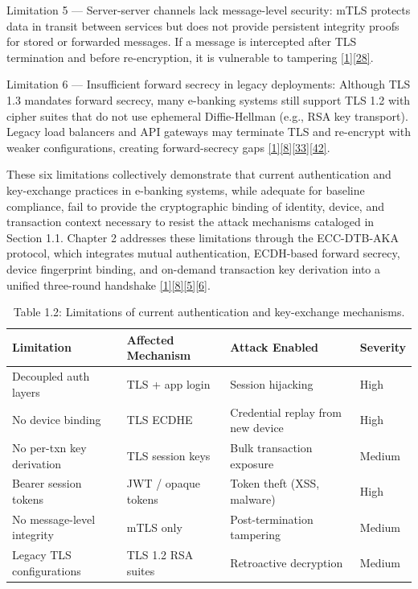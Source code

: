 \indent Limitation 5 --- Server-server channels lack message-level security: mTLS protects data in transit between services but does not provide persistent integrity proofs for stored or forwarded messages. If a message is intercepted after TLS termination and before re-encryption, it is vulnerable to tampering \hyperref[ref:1]{[1]}\hyperref[ref:28]{[28]}.

\indent Limitation 6 --- Insufficient forward secrecy in legacy deployments: Although TLS 1.3 mandates forward secrecy, many e-banking systems still support TLS 1.2 with cipher suites that do not use ephemeral Diffie-Hellman (e.g., RSA key transport). Legacy load balancers and API gateways may terminate TLS and re-encrypt with weaker configurations, creating forward-secrecy gaps \hyperref[ref:1]{[1]}\hyperref[ref:8]{[8]}\hyperref[ref:33]{[33]}\hyperref[ref:42]{[42]}.

\indent These six limitations collectively demonstrate that current authentication and key-exchange practices in e-banking systems, while adequate for baseline compliance, fail to provide the cryptographic binding of identity, device, and transaction context necessary to resist the attack mechanisms cataloged in Section 1.1. Chapter 2 addresses these limitations through the ECC-DTB-AKA protocol, which integrates mutual authentication, ECDH-based forward secrecy, device fingerprint binding, and on-demand transaction key derivation into a unified three-round handshake \hyperref[ref:1]{[1]}\hyperref[ref:8]{[8]}\hyperref[ref:5]{[5]}\hyperref[ref:6]{[6]}.

\begin{table}[htbp]
\centering
\begin{tabular}{llll}
\toprule
Limitation & Affected Mechanism & Attack Enabled & Severity \\
\midrule
Decoupled auth layers & TLS + app login & Session hijacking & High \\
No device binding & TLS ECDHE & Credential replay from new device & High \\
No per-txn key derivation & TLS session keys & Bulk transaction exposure & Medium \\
Bearer session tokens & JWT / opaque tokens & Token theft (XSS, malware) & High \\
No message-level integrity & mTLS only & Post-termination tampering & Medium \\
Legacy TLS configurations & TLS 1.2 RSA suites & Retroactive decryption & Medium \\
\bottomrule
\end{tabular}
\caption{Table 1.2: Limitations of current authentication and key-exchange mechanisms.}\label{tbl:1.2}
\end{table}
